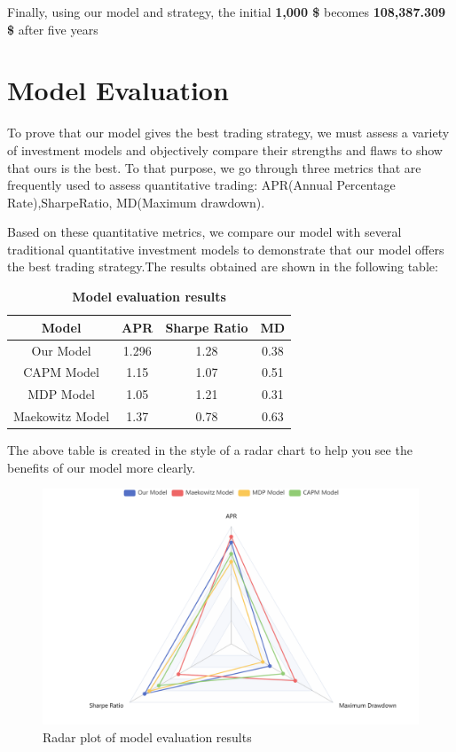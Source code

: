\documentclass{mcmthesis}
\begin{document}
Finally, using our model and strategy, the initial \textbf{1,000 \$} becomes \textbf{108,387.309 \$} after five years


\section{Model Evaluation}
To prove that our model gives the best trading strategy, we must assess a variety of investment models and objectively compare their strengths and flaws to show that ours is the best. To that purpose, we go through three metrics that are frequently used to assess quantitative trading: APR(Annual Percentage Rate),SharpeRatio, MD(Maximum drawdown).

Based on these quantitative metrics, we compare our model with several traditional quantitative investment models to demonstrate that our model offers the best trading strategy.The results obtained are shown in the following table:

\begin{table}[H]
	\caption{\textbf{Model evaluation results}}%
	\label{Model Evaluation}
	\centering%
	\begin{tabular}{cccc}%
		\toprule%
		Model&APR&Sharpe Ratio&MD \\
	\midrule%
	Our Model&1.296&1.28&0.38\\
	CAPM Model&1.15&1.07&0.51\\
	MDP Model&1.05&1.21&0.31\\
	Maekowitz Model&1.37&0.78&0.63\\
	\bottomrule%
\end{tabular}
\end{table}

The above table is created in the style of a radar chart to help you see the benefits of our model more clearly.

\begin{figure}[H]	%
	\centering
	\includegraphics[height=0.6\textwidth]{radar}	%
	\caption{Radar plot of model evaluation results} 
	\label{fig:radar}		%
\end{figure}
\end{document}
